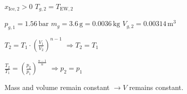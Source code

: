 \( x_{\text{Ice},2} > 0 \)  
\( T_{g,2} = T_{\text{EW},2} \)  

\( p_{g,1} = 1.56 \, \text{bar} \)  
\( m_g = 3.6 \, \text{g} = 0.0036 \, \text{kg} \)  
\( V_{g,2} = 0.00314 \, \text{m}^3 \)  

\( T_2 = T_1 \cdot \left( \frac{V_1}{V_2} \right)^{n-1} \)  
\( \Rightarrow T_2 = T_1 \)  

\( \frac{T_2}{T_1} = \left( \frac{p_2}{p_1} \right)^{\frac{n-1}{n}} \)  
\( \Rightarrow p_2 = p_1 \)  

Mass and volume remain constant \( \rightarrow V \) remains constant.